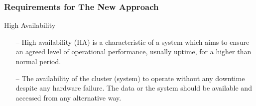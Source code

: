 \begin{frame}[c]{ }
	\frametitle{Requirements for The New Approach }
	High Availability
	\begin{itemize}  [<+->]
		\item [--] {\footnotesize High availability (HA) is a characteristic of a system which aims to ensure an agreed level of operational performance, usually uptime, for a higher than normal period}.
		\item [--] {\footnotesize The availability of the cluster (system) to operate without any downtime despite any hardware failure. The data or the system should be available and accessed from any alternative way}.
		
	\end{itemize}
\end{frame}

